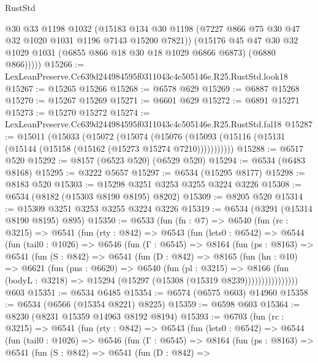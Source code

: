 \begin{lexlean}{RustStd}
\begin{coremodule}
          @30
          @33
          @1198
          @1032
          (@15183 @134 @30 @1198 (@7227 @866 @75 @30 @47 @32 @1020 @1031 @1196 @7143 @15200 @7821))
          (@15176
            @45
            @47
            @30
            @32
            @1029
            @1031
            (@6855 @866 @18 @30 @18 @1029 @6866 @6873)
            (@6880 @866)))))
@15266 := LexLeanPreserve.Cc639d244984595f0311043c4c505146e.R25.RustStd.look18
@15267 := @15265 @15266
@15268 := @6578 @629
@15269 := @6887 @15268
@15270 := @15267 @15269
@15271 := @6601 @629
@15272 := @6891 @15271
@15273 := @15270 @15272
@15274 := LexLeanPreserve.Cc639d244984595f0311043c4c505146e.R25.RustStd.fal18
@15287 := @15011
    (@15033
      (@15072
        (@15074
          (@15076 (@15093 (@15116 (@15131 (@15144 (@15158 (@15162 (@15273 @15274 @7210)))))))))))
@15288 := @6517 @520
@15292 := @8157 (@6523 @520) (@6529 @520)
@15294 := @6534 (@6483 @8168)
@15295 := @3222 @5657
@15297 := @6534 (@15295 @8177)
@15298 := @8183 @520
@15303 := @15298 @3251 @3253 @3255 @3224 @3226
@15308 := @6534 (@8182 (@15303 @8190 @8195) @8202)
@15309 := @8205 @520
@15314 := @15309 @3251 @3253 @3255 @3224 @3226
@15319 := @6534 (@3291 (@15314 @8190 @8195) @895)
@15350 := @6533
    (fun (fn : @7) =>
    @6540
      (fun (rc : @3215) =>
      @6541
        (fun (rty : @842) =>
        @6543
          (fun (lets0 : @6542) =>
          @6544
            (fun (tail0 : @1026) =>
            @6546
              (fun (Γ : @6545) =>
              @8164
                (fun (ps : @8163) =>
                @6541
                  (fun (S : @842) =>
                  @6541
                    (fun (D : @842) =>
                    @8165
                      (fun (hn : @10) =>
                      @6621
                        (fun (pns : @6620) =>
                        @6540
                          (fun (pl : @3215) =>
                          @8166
                            (fun (bodyL : @3218) =>
                            @15294 (@15297 (@15308 (@15319 @8239))))))))))))))))
    @603
@15351 := @6534 @6485
@15354 := @6574 (@6575 @603) @14960
@15358 := @6534 (@6566 (@15354 @8221) @8225)
@15359 := @6598 @603
@15364 := @8230 (@8231 @15359 @14963 @8192 @8194)
@15393 := @6703
    (fun (rc : @3215) =>
    @6541
      (fun (rty : @842) =>
      @6543
        (fun (lets0 : @6542) =>
        @6544
          (fun (tail0 : @1026) =>
          @6546
            (fun (Γ : @6545) =>
            @8164
              (fun (ps : @8163) =>
              @6541
                (fun (S : @842) =>
                @6541
                  (fun (D : @842) =>

\end{coremodule}
\end{lexlean}
